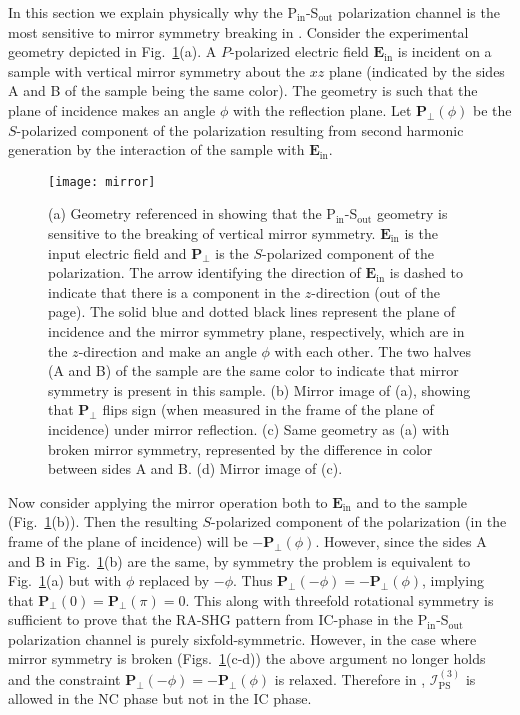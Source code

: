 In this section we explain physically why the P$_\mathrm{in}$-S$_\mathrm{out}$ polarization channel is the most sensitive to mirror symmetry breaking in \tastwo.
Consider the experimental geometry depicted in Fig.~\ref{fig:mirror}(a).
A $P$-polarized electric field $\bm{E}_\mathrm{in}$ is incident on a sample with vertical mirror symmetry about the $xz$ plane (indicated by the sides A and B of the sample being the same color). The geometry is such that the plane of incidence makes an angle $\phi$ with the reflection plane.
Let $\bm{P}_\perp(\phi)$ be the $S$-polarized component of the polarization resulting from second harmonic generation by the interaction of the sample with $\bm{E}_\mathrm{in}$.

\begin{figure}
\texttt{[image: mirror]}
\caption{\label{fig:mirror}(a) Geometry referenced in showing that the P$_\mathrm{in}$-S$_\mathrm{out}$ geometry is sensitive to the breaking of vertical mirror symmetry. $\bm{E}_\mathrm{in}$ is the input electric field and $\bm{P}_\perp$ is the $S$-polarized component of the polarization. The arrow identifying the direction of $\bm{E}_\mathrm{in}$ is dashed to indicate that there is a component in the $z$-direction (out of the page). The solid blue and dotted black lines represent the plane of incidence and the mirror symmetry plane, respectively, which are in the $z$-direction and make an angle $\phi$ with each other. The two halves (A and B) of the sample are the same color to indicate that mirror symmetry is present in this sample. (b) Mirror image of (a), showing that $\bm{P}_\perp$ flips sign (when measured in the frame of the plane of incidence) under mirror reflection. (c) Same geometry as (a) with broken mirror symmetry, represented by the difference in color between sides A and B. (d) Mirror image of (c).}
\end{figure}

Now consider applying the mirror operation both to $\bm{E}_\mathrm{in}$ and to the sample (Fig.~\ref{fig:mirror}(b)).
Then the resulting $S$-polarized component of the polarization (in the frame of the plane of incidence) will be $-\bm{P}_\perp(\phi)$.
However, since the sides A and B in Fig.~\ref{fig:mirror}(b) are the same, by symmetry the problem is equivalent to Fig.~\ref{fig:mirror}(a) but with $\phi$ replaced by $-\phi$.
Thus $\bm{P}_\perp(-\phi) = -\bm{P}_\perp(\phi)$, implying that $\bm{P}_\perp(0) = \bm{P}_\perp(\pi) = 0$.
This along with threefold rotational symmetry is sufficient to prove that the RA-SHG pattern from IC-phase \tastwo in the P$_\mathrm{in}$-S$_\mathrm{out}$ polarization channel is purely sixfold-symmetric.
However, in the case where mirror symmetry is broken (Figs.~\ref{fig:mirror}(c-d)) the above argument no longer holds and the constraint $\bm{P}_\perp(-\phi) = -\bm{P}_\perp(\phi)$ is relaxed.
Therefore in \tastwo, $\mathscr{I}_\mathrm{PS}^{(3)}$ is allowed in the NC phase but not in the IC phase.

